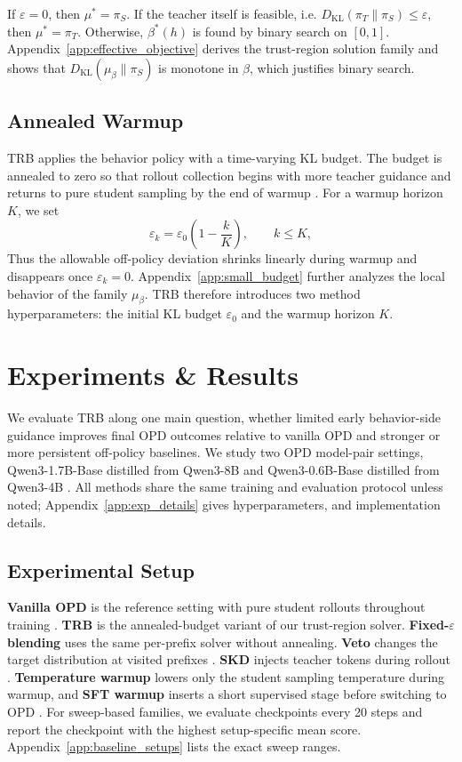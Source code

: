 \documentclass[11pt]{article}
\begin{document}
If $\varepsilon=0$, then $\mu^*=\pi_S$.
If the teacher itself is feasible, i.e. $D_{\mathrm{KL}}(\pi_T\|\pi_S)\le\varepsilon$, then $\mu^*=\pi_T$.
Otherwise, $\beta^*(h)$ is found by binary search on $[0,1]$.
Appendix~\ref{app:effective_objective} derives the trust-region solution family and shows that $D_{\mathrm{KL}}(\mu_\beta\|\pi_S)$ is monotone in $\beta$, which justifies binary search.

\subsection{Annealed Warmup}

TRB applies the behavior policy with a time-varying KL budget.
The budget is annealed to zero so that rollout collection begins with more teacher guidance and returns to pure student sampling by the end of warmup \citep{dagger, bengio2015scheduled}.
For a warmup horizon $K$, we set
\begin{equation}
\varepsilon_k
=
\varepsilon_0 \left(1-\frac{k}{K}\right),
\qquad k \le K,
\end{equation}
Thus the allowable off-policy deviation shrinks linearly during warmup and disappears once $\varepsilon_k=0$.
Appendix~\ref{app:small_budget} further analyzes the local behavior of the family $\mu_\beta$. TRB therefore introduces two method hyperparameters: the initial KL budget $\varepsilon_0$ and the warmup horizon $K$.

\section{Experiments \& Results}

We evaluate TRB along one main question, whether limited early behavior-side guidance improves final OPD outcomes relative to vanilla OPD and stronger or more persistent off-policy baselines.
We study two OPD model-pair settings, Qwen3-1.7B-Base distilled from Qwen3-8B and Qwen3-0.6B-Base distilled from Qwen3-4B \citep{yang2025qwen3}.
All methods share the same training and evaluation protocol unless noted; Appendix~\ref{app:exp_details} gives hyperparameters, and implementation details.

\subsection{Experimental Setup}

\textbf{Vanilla OPD} is the reference setting with pure student rollouts throughout training \citep{opd,li2026rethinking}.
\textbf{TRB} is the annealed-budget variant of our trust-region solver.
\textbf{Fixed-$\varepsilon$ blending} uses the same per-prefix solver without annealing.
\textbf{Veto} changes the target distribution at visited prefixes \citep{veto}.
\textbf{SKD} injects teacher tokens during rollout \citep{skd}.
\textbf{Temperature warmup} lowers only the student sampling temperature during warmup, and \textbf{SFT warmup} inserts a short supervised stage before switching to OPD \citep{hinton2015distilling,opd}.
For sweep-based families, we evaluate checkpoints every 20 steps and report the checkpoint with the highest setup-specific mean score.
Appendix~\ref{app:baseline_setups} lists the exact sweep ranges.
\end{document}
